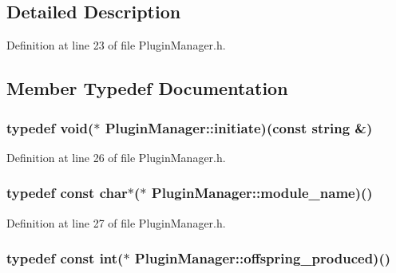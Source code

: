 \subsection{Detailed Description}


Definition at line 23 of file PluginManager.h.

\subsection{Member Typedef Documentation}
\hypertarget{classPluginManager_b500db2879e847e3cf37918762255898}{
\subsubsection{\setlength{\rightskip}{0pt plus 5cm}typedef void($\ast$ {\bf PluginManager::initiate})(const string \&)}}
\label{classPluginManager_b500db2879e847e3cf37918762255898}




Definition at line 26 of file PluginManager.h.\hypertarget{classPluginManager_95364d1fe57a2da74463958f77891e60}{
\subsubsection{\setlength{\rightskip}{0pt plus 5cm}typedef const char$\ast$($\ast$ {\bf PluginManager::module\_\-name})()}}
\label{classPluginManager_95364d1fe57a2da74463958f77891e60}




Definition at line 27 of file PluginManager.h.\hypertarget{classPluginManager_c8e3b761e36272f70ea015348474ca42}{
\subsubsection{\setlength{\rightskip}{0pt plus 5cm}typedef const int($\ast$ {\bf PluginManager::offspring\_\-produced})()}}
\label{classPluginManager_c8e3b761e36272f70ea015348474ca42}




